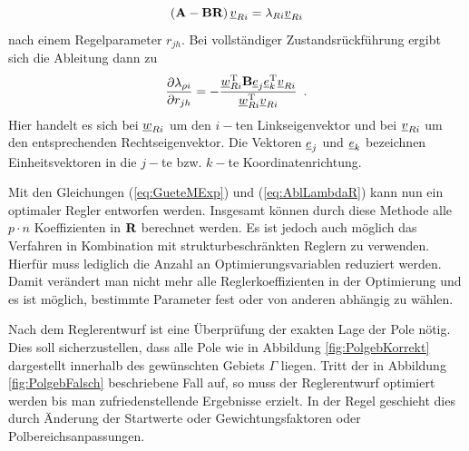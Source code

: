 \begin{equation}
	\left( \textbf{A} - \textbf{B}\textbf{R} \right)\underline{v}_{R i} = \lambda_{R i}\underline{v}_{R i}
\end{equation}
nach einem Regelparameter $r_{jh}$. Bei vollständiger Zustandsrückführung ergibt sich die Ableitung dann zu
\begin{equation}\label{eq:AblLambdaR}
	\frac{\partial \lambda_{\rho i} }{\partial r_{jh}} = 
	- \frac{\underline{w}^{\textnormal{T}}_{R i} \textbf{B} \underline{e}_{j} \underline{e}^{\textnormal{T}}_k \underline{v}_{R i} }
		   {\underline{w}^{\textnormal{T}}_{R i}  \underline{v}_{R i}}
	\, \, \, .
\end{equation}
Hier handelt es sich bei $\underline{w}_{R i}$ um den $i-$ten Linkseigenvektor und bei $ \underline{v}_{R i}$ um den entsprechenden Rechtseigenvektor. Die Vektoren $\underline{e}_{j}$ und $\underline{e}_{k}$ bezeichnen Einheitsvektoren in die $j-$te bzw. $k-$te Koordinatenrichtung.

Mit den Gleichungen (\ref{eq:GueteMExp}) und (\ref{eq:AblLambdaR}) kann nun ein optimaler Regler entworfen werden. Insgesamt können durch diese Methode alle $p\cdot n$ Koeffizienten in $\textbf{R}$ berechnet werden. Es ist jedoch auch möglich das Verfahren in Kombination mit strukturbeschränkten Reglern zu verwenden. Hierfür muss lediglich die Anzahl an Optimierungsvariablen  reduziert werden. Damit verändert man nicht mehr alle Reglerkoeffizienten in der Optimierung und es ist möglich, bestimmte Parameter fest oder von anderen abhängig zu wählen.

Nach dem Reglerentwurf ist eine Überprüfung der exakten Lage der Pole nötig. Dies soll sicherzustellen, dass alle Pole wie in Abbildung \ref{fig:PolgebKorrekt} dargestellt innerhalb des gewünschten Gebiets $\Gamma$ liegen. Tritt der in Abbildung \ref{fig:PolgebFalsch} beschriebene Fall auf, so muss der Reglerentwurf optimiert werden bis man zufriedenstellende Ergebnisse erzielt. In der Regel geschieht dies durch Änderung der Startwerte oder Gewichtungsfaktoren oder Polbereichsanpassungen.

